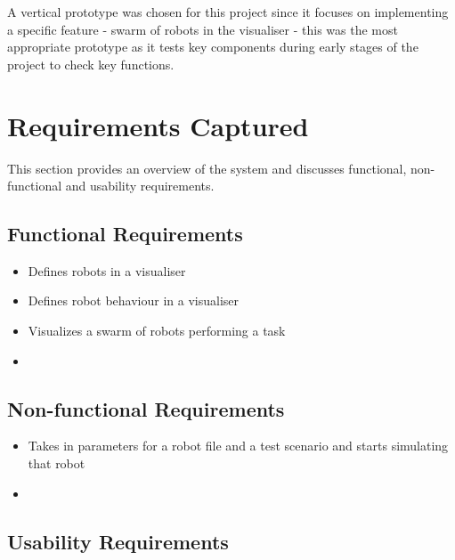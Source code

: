 \documentclass[11pt,a4paper]{article}
\begin{document}
A vertical prototype was chosen for this project since it focuses on
implementing a specific feature - swarm of robots in the visualiser - this was
the most appropriate prototype as it tests key components during early stages
of the project to check key functions.

\section{Requirements Captured}


This section provides an overview of the system and discusses functional,
non-functional and usability requirements.

\subsection{Functional Requirements}


\begin{itemize}
  \item Defines robots in a visualiser
  \item Defines robot behaviour in a visualiser
  \item Visualizes a swarm of robots performing a task
  \item
\end{itemize}

\subsection{Non-functional Requirements}


\begin{itemize}
  \item Takes in parameters for a robot file and a test scenario and starts
      simulating that robot
  \item
\end{itemize}


\subsection{Usability Requirements}
\end{document}
